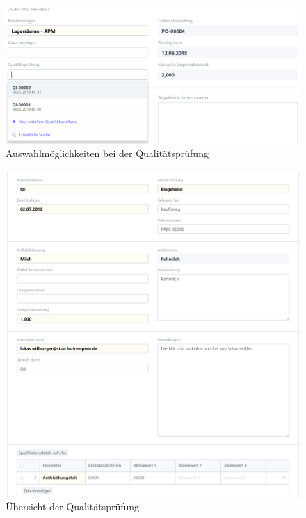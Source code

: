 \begin{figure}
  \centering
  \includegraphics[width=\textwidth]{Bilder/Qualitaetskontrolle_auswaehlen.PNG}
  \caption{Auswahlmöglichkeiten bei der Qualitätsprüfung}
  \label{fig:auswQual}
\end{figure}
\begin{figure}
  \centering
  \includegraphics[width=\textwidth]{Bilder/Qualitaetspruefung.PNG}
  \caption{Übersicht der Qualitätsprüfung}
  \label{fig:qualPruef}
\end{figure}
